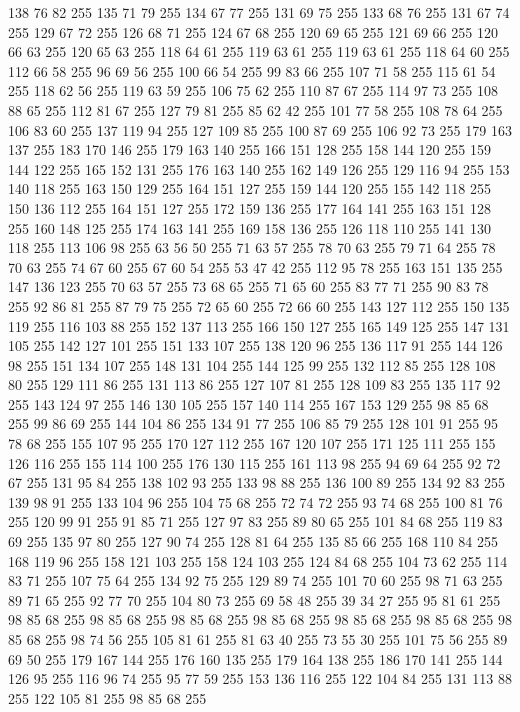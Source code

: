 138 76 82 255 135 71 79 255 134 67 77 255 131 69 75 255 133 68 76 255 131 67 74 255 129 67 72 255 126 68 71 255 124 67 68 255 120 69 65 255 121 69 66 255 120 66 63 255 120 65 63 255 118 64 61 255 119 63 61 255 119 63 61 255 118 64 60 255 112 66 58 255 96 69 56 255 100 66 54 255 99 83 66 255 107 71 58 255 115 61 54 255 118 62 56 255 119 63 59 255 106 75 62 255 110 87 67 255 114 97 73 255 108 88 65 255 112 81 67 255 127 79 81 255 85 62 42 255 101 77 58 255 108 78 64 255 106 83 60 255 137 119 94 255 127 109 85 255 100 87 69 255 106 92 73 255 179 163 137 255 183 170 146 255 179 163 140 255 166 151 128 255 158 144 120 255 159 144 122 255 165 152 131 255 176 163 140 255 162 149 126 255 129 116 94 255 153 140 118 255 163 150 129 255 164 151 127 255 159 144 120 255 155 142 118 255 150 136 112 255 164 151 127 255 172 159 136 255 177 164 141 255 163 151 128 255 160 148 125 255 174 163 141 255 169 158 136 255 126 118 110 255 141 130 118 255
113 106 98 255 63 56 50 255 71 63 57 255 78 70 63 255 79 71 64 255 78 70 63 255 74 67 60 255 67 60 54 255 53 47 42 255 112 95 78 255 163 151 135 255 147 136 123 255 70 63 57 255 73 68 65 255 71 65 60 255 83 77 71 255 90 83 78 255 92 86 81 255 87 79 75 255 72 65 60 255 72 66 60 255 143 127 112 255 150 135 119 255 116 103 88 255 152 137 113 255 166 150 127 255 165 149 125 255 147 131 105 255 142 127 101 255 151 133 107 255 138 120 96 255 136 117 91 255 144 126 98 255 151 134 107 255 148 131 104 255 144 125 99 255 132 112 85 255 128 108 80 255 129 111 86 255 131 113 86 255 127 107 81 255 128 109 83 255 135 117 92 255 143 124 97 255 146 130 105 255 157 140 114 255 167 153 129 255 98 85 68 255 99 86 69 255 144 104 86 255 134 91 77 255 106 85 79 255 128 101 91 255 95 78 68 255 155 107 95 255 170 127 112 255 167 120 107 255 171 125 111 255 155 126 116 255 155 114 100 255 176 130 115 255 161 113 98 255 94 69 64 255 92 72 67 255
131 95 84 255 138 102 93 255 133 98 88 255 136 100 89 255 134 92 83 255 139 98 91 255 133 104 96 255 104 75 68 255 72 74 72 255 93 74 68 255 100 81 76 255 120 99 91 255 91 85 71 255 127 97 83 255 89 80 65 255 101 84 68 255 119 83 69 255 135 97 80 255 127 90 74 255 128 81 64 255 135 85 66 255 168 110 84 255 168 119 96 255 158 121 103 255 158 124 103 255 124 84 68 255 104 73 62 255 114 83 71 255 107 75 64 255 134 92 75 255 129 89 74 255 101 70 60 255 98 71 63 255 89 71 65 255 92 77 70 255 104 80 73 255 69 58 48 255 39 34 27 255 95 81 61 255 98 85 68 255 98 85 68 255 98 85 68 255 98 85 68 255 98 85 68 255 98 85 68 255 98 85 68 255 98 74 56 255 105 81 61 255 81 63 40 255 73 55 30 255 101 75 56 255 89 69 50 255 179 167 144 255 176 160 135 255 179 164 138 255 186 170 141 255 144 126 95 255 116 96 74 255 95 77 59 255 153 136 116 255 122 104 84 255 131 113 88 255 122 105 81 255 98 85 68 255
